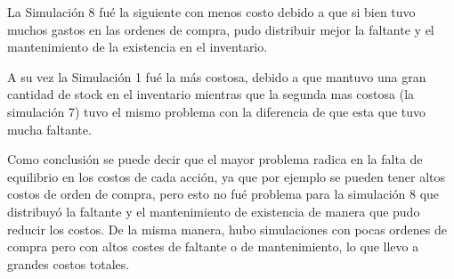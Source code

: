 La Simulación 8 fué la siguiente con menos costo debido a que si bien tuvo muchos gastos en las ordenes de compra, pudo distribuir mejor la faltante y el mantenimiento de la existencia en el inventario.

A su vez la Simulación 1 fué la más costosa, debido a que mantuvo una gran cantidad de stock en el inventario mientras que la segunda mas costosa (la simulación 7) tuvo el mismo problema con la diferencia de que esta que tuvo mucha faltante.

Como conclusión se puede decir que el mayor problema radica en la falta de equilibrio en los costos de cada acción, ya que por ejemplo se pueden tener altos costos de orden de compra, pero esto no fué problema para la simulación 8 que distribuyó la faltante y el mantenimiento de existencia de manera que pudo reducir los costos.
De la misma manera, hubo simulaciones con pocas ordenes de compra pero con altos costes de faltante o de mantenimiento, lo que llevo a grandes costos totales.
